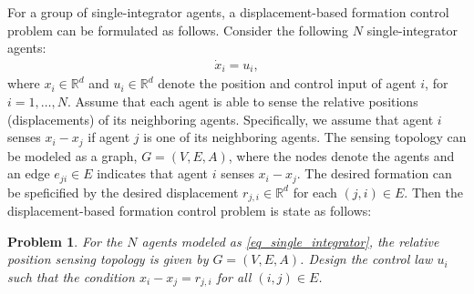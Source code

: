 \documentclass{ifacconf}
\newtheorem{problem}{Problem}[section]
\begin{document}
For a group of single-integrator agents, a displacement-based formation control problem can be formulated as follows. Consider the following $N$ single-integrator agents:
\begin{align} \label{eq_single_integrator}
\dot{x}_i = u_i,
\end{align}
where $x_i \in \mathbb{R}^d$ and $u_i \in \mathbb{R}^d$ denote the position and control input of agent $i$, for $i = 1,\ldots,N$.  Assume that each agent is able to sense the relative positions (displacements) of its neighboring agents. Specifically, we assume that agent $i$ senses $x_i - x_j$ if agent $j$ is one of its neighboring agents. The sensing topology can be modeled as a graph, $G = (V,E,A)$, where the nodes denote the agents and an edge $e_{ji} \in E$ indicates that agent $i$ senses $x_i - x_j$. The desired formation can be speficified by the desired displacement $r_{j,i} \in \mathbb{R}^d$ for each $(j,i) \in E$. Then the displacement-based formation control problem is state as follows: 
\begin{problem} \label{problem_displacement}
For the $N$ agents modeled as \eqref{eq_single_integrator}, the relative position sensing topology is given by $G = (V,E,A)$. Design the control law $u_i$ such that the condition $x_i - x_j = r_{j,i}$ for  all $(i,j) \in E$.
\end{problem}

\end{document}
